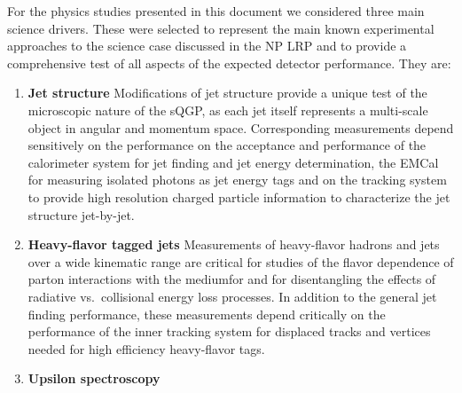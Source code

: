 For the physics studies presented in this document we considered three
main science drivers. These were selected to represent the main known 
experimental approaches to the science case discussed in the NP LRP and
to provide a comprehensive test of all aspects of the expected detector
performance. They are:
\begin{enumerate}
\item {\bf Jet structure} Modifications of jet structure provide a unique test
of the microscopic nature of the sQGP, as each jet itself represents a multi-scale
object in angular and momentum space. Corresponding measurements depend
sensitively on the performance on the acceptance and performance 
of the calorimeter system for jet finding and jet energy determination, the
EMCal for measuring isolated photons as jet energy tags and on the tracking
system to provide high resolution charged particle information to characterize
the jet structure jet-by-jet.
\item {\bf Heavy-flavor tagged jets} Measurements of heavy-flavor hadrons 
and jets over a wide kinematic range are critical for studies of
the flavor dependence of parton interactions with the mediumfor and for 
disentangling the effects of radiative vs.\ collisional energy loss processes.
In addition to the general jet finding performance, these measurements depend 
critically on the performance of the inner tracking system for displaced 
tracks and vertices needed for high efficiency heavy-flavor tags.
\item {\bf Upsilon spectroscopy} 
\end{enumerate}






